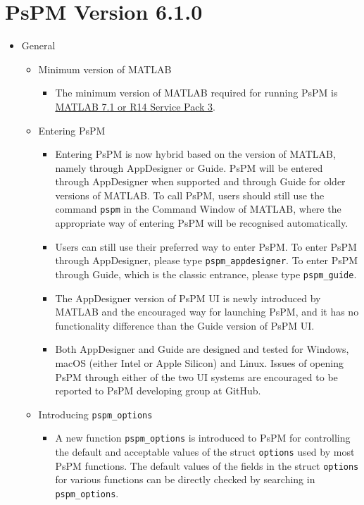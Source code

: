 \documentclass[english]{article}
\numberwithin{equation}{section}
\numberwithin{figure}{section}
\begin{document}
\section{PsPM Version 6.1.0}
\begin{itemize}
	\item General
	\begin{itemize}
		\item Minimum version of MATLAB
		\begin{itemize}
			\item The minimum version of MATLAB required for running PsPM is \href{https://uk.mathworks.com/content/dam/mathworks/mathworks-dot-com/support/sysreq/files/SystemRequirements-Release14-ServicePack3_SupportedCompilers.pdf}{MATLAB 7.1 or R14 Service Pack 3}.
		\end{itemize}
		\item Entering PsPM
		\begin{itemize}
			\item Entering PsPM is now hybrid based on the version of MATLAB, namely through AppDesigner or Guide. PsPM will be entered through AppDesigner when supported and through Guide for older versions of MATLAB. To call PsPM, users should still use the command \texttt{pspm} in the Command Window of MATLAB, where the appropriate way of entering PsPM will be recognised automatically.
			\item Users can still use their preferred way to enter PsPM. To enter PsPM through AppDesigner, please type \texttt{pspm\_appdesigner}. To enter PsPM through Guide, which is the classic entrance, please type \texttt{pspm\_guide}.
			\item The AppDesigner version of PsPM UI is newly introduced by MATLAB and the encouraged way for launching PsPM, and it has no functionality difference than the Guide version of PsPM UI.
			\item Both AppDesigner and Guide are designed and tested for Windows, macOS (either Intel or Apple Silicon) and Linux. Issues of opening PsPM through either of the two UI systems are encouraged to be reported to PsPM developing group at GitHub.
		\end{itemize}
		\item Introducing \texttt{pspm\_options}
		\begin{itemize}
			\item A new function \texttt{pspm\_options} is introduced to PsPM for controlling the default and acceptable values of the struct \texttt{options} used by most PsPM functions. The default values of the fields in the struct \texttt{options} for various functions can be directly checked by searching in \texttt{pspm\_options}.

\end{itemize}
\end{itemize}
\end{itemize}
\end{document}
